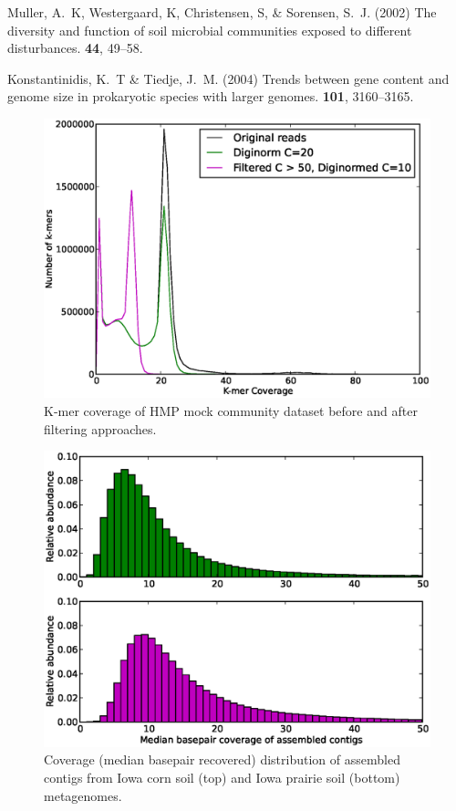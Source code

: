 \documentclass{pnastwo}
\begin{document}
\begin{article}
\begin{thebibliography}{10}
 Muller, A.~K, Westergaard, K, Christensen, S, \&
Sorensen, S.~J. \newblock (2002) {The diversity and function of soil microbial
communities exposed to different disturbances.}  {\bf 44}, 49--58.

 Konstantinidis, K.~T \& Tiedje, J.~M. \newblock
(2004) {Trends between gene content and genome size in prokaryotic species with
larger genomes}.  {\bf 101}, 3160--3165.

\end{thebibliography} \end{article}

\begin{figure} \begin{center}
\centerline{\includegraphics[width=.7\textwidth]{./figures/fig1-hmpassemblyhist.eps}}
\caption{K-mer coverage of HMP mock community dataset before and after filtering
approaches.} \label{kmercoverage} \end{center} \end{figure}


\begin{figure} \begin{center}
\centerline{\includegraphics[width=.7\textwidth]{./figures/fig3-coverage.eps}}
\caption{Coverage (median basepair recovered) distribution of assembled contigs
from Iowa corn soil (top) and Iowa prairie soil (bottom) metagenomes.}
\label{soilassemblycoverage} \end{center} \end{figure}
\end{document}

